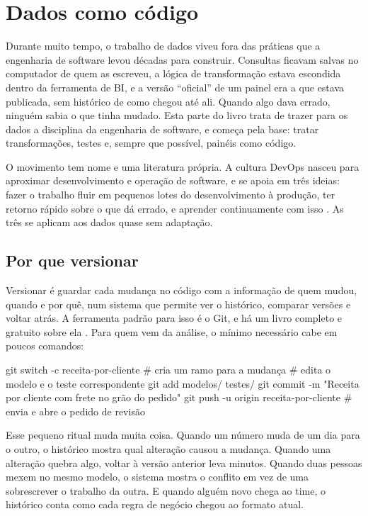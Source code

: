 \chapter{Dados como código}
\label{cap:dados-codigo}

Durante muito tempo, o trabalho de dados viveu fora das práticas que a engenharia de
software levou décadas para construir. Consultas ficavam salvas no computador de quem as
escreveu, a lógica de transformação estava escondida dentro da ferramenta de BI, e a versão
\enquote{oficial} de um painel era a que estava publicada, sem histórico de como chegou até
ali. Quando algo dava errado, ninguém sabia o que tinha mudado. Esta parte do livro trata de
trazer para os dados a disciplina da engenharia de software, e começa pela base: tratar
transformações, testes e, sempre que possível, painéis como código.

O movimento tem nome e uma literatura própria. A cultura DevOps nasceu para aproximar
desenvolvimento e operação de software, e se apoia em três ideias: fazer o trabalho fluir
em pequenos lotes do desenvolvimento à produção, ter retorno rápido sobre o que dá errado, e
aprender continuamente com isso \parencite{kim2016}. As três se aplicam aos dados quase sem
adaptação.

\section{Por que versionar}
\label{sec:versionar}

Versionar é guardar cada mudança no código com a informação de quem mudou, quando e por
quê, num sistema que permite ver o histórico, comparar versões e voltar atrás. A ferramenta
padrão para isso é o Git, e há um livro completo e gratuito sobre ela \parencite{chacon2014}.
Para quem vem da análise, o mínimo necessário cabe em poucos comandos:

\begin{terminal}
git switch -c receita-por-cliente         # cria um ramo para a mudança
# edita o modelo e o teste correspondente
git add modelos/ testes/
git commit -m "Receita por cliente com frete no grão do pedido"
git push -u origin receita-por-cliente    # envia e abre o pedido de revisão
\end{terminal}

Esse pequeno ritual muda muita coisa. Quando um número muda de um dia para o outro, o
histórico mostra qual alteração causou a mudança. Quando uma alteração quebra algo, voltar à
versão anterior leva minutos. Quando duas pessoas mexem no mesmo modelo, o sistema mostra o
conflito em vez de uma sobrescrever o trabalho da outra. E quando alguém novo chega ao time,
o histórico conta como cada regra de negócio chegou ao formato atual.

